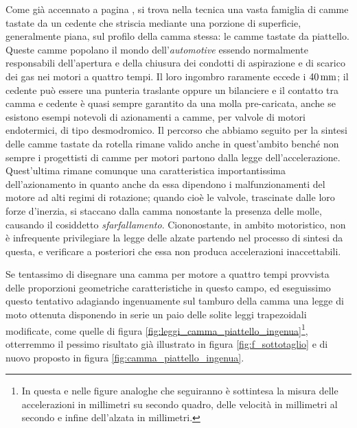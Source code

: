 \noindent Come gi\`a accennato a pagina \pageref{fig:f_campiat}, si trova
nella tecnica una vasta famiglia di camme tastate da un cedente
che striscia mediante una porzione di superficie, generalmente
piana, sul profilo della camma
stessa: le camme tastate da piattello. Queste camme popolano il mondo
dell'{\em automotive} essendo normalmente responsabili dell'apertura e della
chiusura dei condotti di aspirazione e di scarico dei gas nei motori a quattro
tempi. Il loro ingombro raramente eccede i $40\, {\rm mm}$; il cedente
 pu\`o essere
una punteria traslante oppure un bilanciere e il contatto tra camma e cedente
\`e quasi sempre garantito da una molla pre-caricata, anche se esistono esempi
notevoli di azionamenti a camme, per valvole di motori endotermici, di
tipo desmodromico.
Il percorso che abbiamo seguito per la sintesi delle camme tastate da rotella
rimane valido anche in quest'ambito bench\'e non sempre i progettisti di camme
per motori partono dalla legge dell'accelerazione. Quest'ultima rimane comunque
una caratteristica importantissima dell'azionamento in quanto anche da essa dipendono
i malfunzionamenti del motore ad alti regimi di rotazione; quando cio\`e
le valvole, trascinate dalle loro forze d'inerzia, si staccano dalla camma
nonostante la presenza delle molle, causando il cosiddetto {\em sfarfallamento}.
Ciononostante, in ambito motoristico, non \`e infrequente privilegiare
la legge delle alzate partendo nel processo di sintesi da
questa, e verificare a posteriori che essa non produca
accelerazioni inaccettabili.

\noindent Se tentassimo di disegnare una camma per motore a quattro tempi
provvista delle proporzioni geometriche  caratteristiche in questo campo,
ed eseguissimo questo tentativo
adagiando ingenuamente sul tamburo della camma
una legge di moto ottenuta disponendo
in serie un paio delle solite leggi trapezoidali modificate, come quelle di figura
\ref{fig:leggi_camma_piattello_ingenua}\footnote{In
questa e nelle figure analoghe che seguiranno \`e sottintesa la misura delle
accelerazioni in millimetri su secondo quadro, delle velocit\`a
in millimetri al secondo e infine dell'alzata
in millimetri.},
otterremmo il pessimo risultato gi\`a illustrato in figura
\ref{fig:f_sottotaglio} e di nuovo proposto in figura
\ref{fig:camma_piattello_ingenua}.

